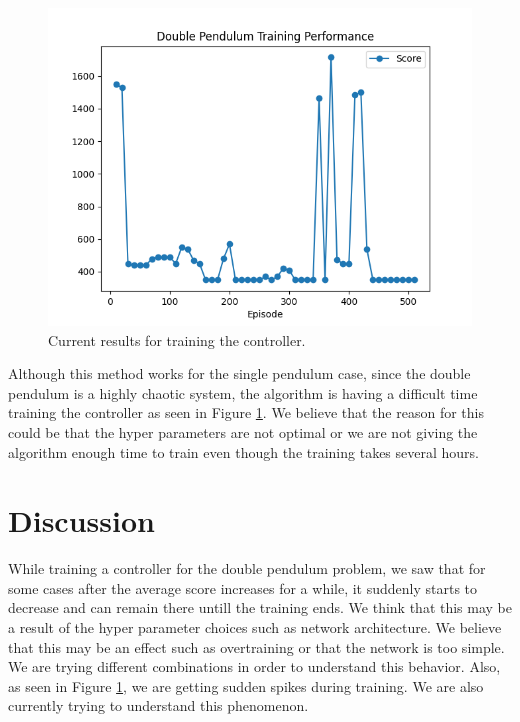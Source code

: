 \documentclass{LTHtwocol} %
\begin{document}
\begin{figure}[H]
	\centering
	\includegraphics[width=0.9\columnwidth]{figures/double_pendulum_eval.png}
	\caption{Current results for training the controller.}
	\label{fig:double_pendulum_score}
\end{figure}
Although this method works for the single pendulum case, since the double pendulum is a highly chaotic system, the algorithm is having a difficult time training the controller as seen in Figure \ref{fig:double_pendulum_score}.
We believe that the reason for this could be that the hyper parameters are not optimal or we are not giving the algorithm enough time to train even though the training takes several hours.
\section{Discussion}
While training a controller for the double pendulum problem, we saw that for some cases after the average score increases for a while, it suddenly starts to decrease and can remain there untill the training ends.
We think that this may be a result of the hyper parameter choices such as network architecture.
We believe that this may be an effect such as overtraining or that the network is too simple.
We are trying different combinations in order to understand this behavior.
Also, as seen in Figure \ref{fig:double_pendulum_score}, we are getting sudden spikes during training.
We are also currently trying to understand this phenomenon.
\end{document}

